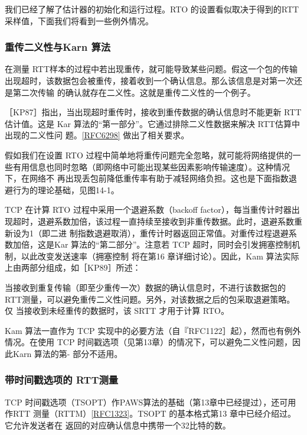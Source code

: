我们已经了解了估计器的初始化和运行过程。RTO 的设置看似取决于得到的RTT采样值，下面我们将看到一些例外情况。
\subsubsection{重传二义性与Karn 算法}

在测量 RTT样本的过程中若出现重传，就可能导致某些问题。假这一个包的传输出现超时，该数据包会被重传，接着收到一个确认信息。那么该信息是对第一次还是第二次传输
的确认就存在二义性。这就是重传二义性的一个例子。

［KP87］指出，当出现超时重传时，接收到重传数据的确认信息时不能更新 RTT 估计值。这是 Kar 算法的“第一部分”。它通过排除二义性数据来解决 RTT估算中出现的二义性问
题。\href{https://www.rfc-editor.org/rfc/rfc6298}{[RFC6298]} 做出了相关要求。

假如我们在设置 RTO 过程中简单地将重传问题完全忽略，就可能将网络提供的一些有用信息也同时忽略（即网络中可能出现某些因素影响传输速度）。这种情况下，在网络不
再出现丢包前降低重传率有助于减轻网络负担。这也是下面指数退避行为的理论基础，见图14-1。

TCP 在计算 RTO 过程中采用一个退避系数（backoff factor），每当重传计时器出现超时，退避系数加倍，该过程一直持续至接收到非重传数据。此时，退避系数重新设为1（即二进
制指数退避取消），重传计时器返回正常值。对重传过程退避系数加倍，这是Kar 算法的“第二部分”。注意若 TCP 超时，同时会引发拥塞控制机制，以此改变发送速率（拥塞控制
将在第16 章详细讨论）。因此，Kam 算法实际上由两部分组成，如［KP89］所述：

当接收到重复传输（即至少重传一次）数据的确认信息时，不进行该数据包的RTT测量，可以避免重传二义性问题。另外，对该数据之后的包采取退避策略。仅
当接收到未经重传的数据时，该 SRTT 才用于计算 RTO。

Kam 算法一直作为 TCP 实现中的必要方法（自『RFC1122］起），然而也有例外情况。在使用 TCP 时间戳选项（见第13章）的情况下，可以避免二义性问题，因此Karn 算法的第-
部分不适用。

\subsubsection{带时间戳选项的 RTT测量}

TCP 时间戳选项（TSOPT）作PAWS算法的基础（第13章中已经提过），还可用作RTT 测量（RTTM）\href{https://www.rfc-editor.org/rfc/rfc1323}{[RFC1323]}。TSOPT 的基本格式第13 章中已经介绍过。它允许发送者在
返回的对应确认信息中携带一个32比特的数。

